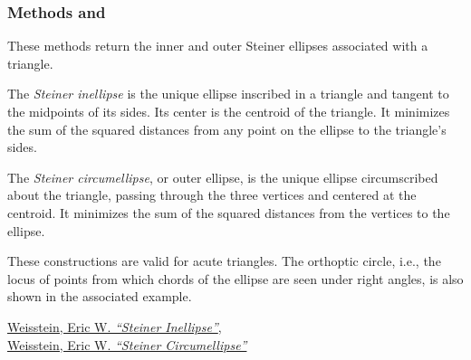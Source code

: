 
\subsubsection{Methods  and } %
\label{ssub:steiner_inellipse_and_circumellipse}

These methods return the inner and outer Steiner ellipses associated with a triangle.

\medskip
\noindent
The \emph{Steiner inellipse} is the unique ellipse inscribed in a triangle and tangent to the midpoints of its sides. Its center is the centroid of the triangle. It minimizes the sum of the squared distances from any point on the ellipse to the triangle’s sides.

\medskip
\noindent
The \emph{Steiner circumellipse}, or outer ellipse, is the unique ellipse circumscribed about the triangle, passing through the three vertices and centered at the centroid. It minimizes the sum of the squared distances from the vertices to the ellipse.

\medskip
\noindent
These constructions are valid for acute triangles. The orthoptic circle, i.e., the locus of points from which chords of the ellipse are seen under right angles, is also shown in the associated example.

\begin{flushright}
\href{https://mathworld.wolfram.com/SteinerInellipse.html}{Weisstein, Eric W. \emph{“Steiner Inellipse”}},\\
\href{https://mathworld.wolfram.com/SteinerCircumellipse.html}{Weisstein, Eric W. \emph{“Steiner Circumellipse”}}
\end{flushright}

\vspace{1em}

